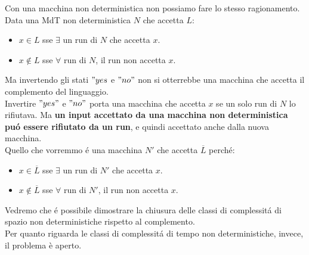 Con una macchina non deterministica non possiamo fare lo stesso ragionamento.
Data una MdT non deterministica $N$ che accetta $L$:
\begin{itemize}
\item $x \in L$ sse $\exists$ un run di $N$ che accetta $x$.
\item $x \notin L$ sse $\forall$ run di $N$, il run non accetta $x$.
\end{itemize}
Ma invertendo gli stati $"yes$ e $"no"$ non si otterrebbe una macchina che accetta il complemento del linguaggio. \\ 
Invertire $"yes"$ e $"no"$ porta una macchina che accetta $x$ se un solo run di $N$ lo rifiutava. 
Ma \textbf{un input accettato da una macchina non deterministica puó essere rifiutato da un run}, e quindi accettato anche dalla nuova macchina. \\
Quello che vorremmo é una macchina $N'$ che accetta $\overline{L}$ perché:
\begin{itemize}
\item $x \in \overline{L}$ sse $\exists$ un run di $N'$ che accetta $x$.
\item $x \notin \overline{L}$ sse $\forall$ run di $N'$, il run non accetta $x$.
\end{itemize}
Vedremo che é possibile dimostrare la chiusura delle classi di complessitá di spazio non deterministiche rispetto al complemento. \\
Per quanto riguarda le classi di complessitá di tempo non deterministiche, invece, il problema è aperto. \\